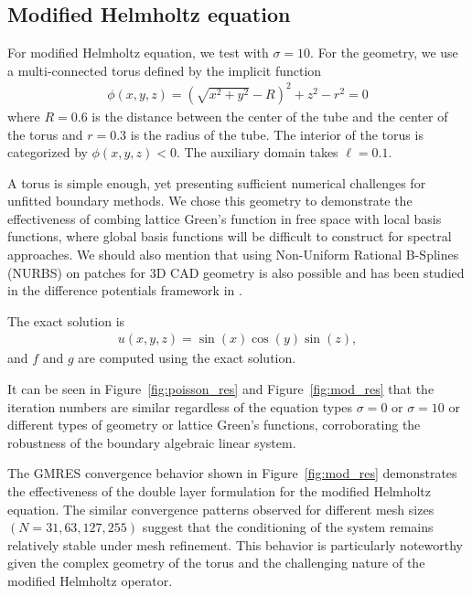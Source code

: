 \subsection{Modified Helmholtz equation}

For modified Helmholtz equation, we test with $\sigma=10$. For the geometry, we use a multi-connected torus defined by the implicit function
\begin{align}
\phi(x,y,z) = (\sqrt{x^2+y^2}-R)^2+z^2-r^2 = 0
\end{align}
where $R=0.6$ is the distance between the center of the tube and the center of the torus and $r=0.3$ is the radius of the tube. The interior of the torus is categorized by $\phi(x,y,z)<0$. The auxiliary domain takes $\ell=0.1$.

\begin{remark}
A torus is simple enough, yet presenting sufficient numerical challenges for unfitted boundary methods. We chose this geometry to demonstrate the effectiveness of combing lattice Green's function in free space with local basis functions, where global basis functions will be difficult to construct for spectral approaches. We should also mention that using Non-Uniform Rational B-Splines (NURBS) on patches for 3D CAD geometry is also possible and has been studied in the difference potentials framework in \cite{PETROPAVLOVSKY2024112705}.
\end{remark}

The exact solution is
\begin{align}
u(x,y,z) = \sin(x)\cos(y)\sin(z),
\end{align}
and $f$ and $g$ are computed using the exact solution.

It can be seen in Figure~\ref{fig:poisson_res} and Figure~\ref{fig:mod_res} that the iteration numbers are similar regardless of the equation types $\sigma=0$ or $\sigma=10$ or different types of geometry or lattice Green's functions, corroborating the robustness of the boundary algebraic linear system.

The GMRES convergence behavior shown in Figure~\ref{fig:mod_res} demonstrates the effectiveness of the double layer formulation for the modified Helmholtz equation. The similar convergence patterns observed for different mesh sizes $(N = 31, 63, 127, 255)$ suggest that the conditioning of the system remains relatively stable under mesh refinement. This behavior is particularly noteworthy given the complex geometry of the torus and the challenging nature of the modified Helmholtz operator.

